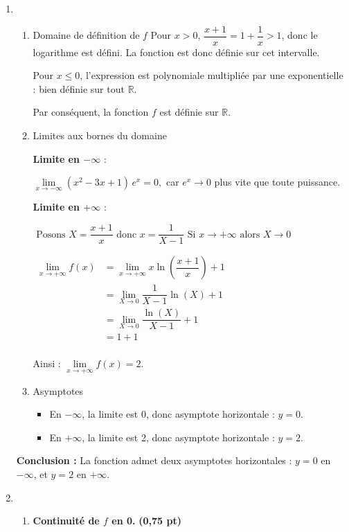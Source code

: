 \documentclass[12pt,a4paper]{article}
\begin{document}
\begin{enumerate}
\item 
    \begin{enumerate}
        \item Domaine de définition de \( f \)
        Pour \( x > 0 \), \( \dfrac{x+1}{x} = 1 + \dfrac{1}{x} > 1 \), donc le logarithme est défini. La fonction est donc définie sur cet intervalle.
     
        Pour \( x \leq 0 \), l'expression est polynomiale multipliée par une exponentielle : bien définie sur tout \( \mathbb{R} \).
     
        Par conséquent, la fonction \( f \) est définie sur \( \mathbb{R} \).

        \item Limites aux bornes du domaine
        
        \textbf{Limite en \( -\infty \)} :

        \( \lim\limits_{x \to -\infty} (x^2 - 3x + 1)\, e^x = 0, \)
         car \( e^x \to 0 \) plus vite que toute puissance.

         \textbf{Limite en \( +\infty \)} :

         \(\text{ Posons } X=\dfrac{x+1}{x} \text{ donc } x=\dfrac{1}{X-1} \text{ Si } x\to +\infty \text{ alors } X \to 0\)

         \(
            \begin{aligned}
                \lim\limits_{x \to +\infty}f(x)&=\lim\limits_{x \to +\infty}x \ln\left( \dfrac{x+1}{x} \right) + 1\\
                &=\lim\limits_{X \to 0}\dfrac{1}{X-1} \ln\left( X \right) + 1\\
                &=\lim\limits_{X \to 0}\dfrac{\ln\left( X \right)}{X-1}  + 1\\
                &=1  + 1\\
            \end{aligned}
        \)
        
         Ainsi : \(\lim\limits_{x \to +\infty} f(x) = 2.\)
        \item Asymptotes
        \begin{itemize}
            \item En \( -\infty \), la limite est 0, donc asymptote horizontale : \( y = 0 \).
            \item En \( +\infty \), la limite est 2, donc asymptote horizontale : \( y = 2 \).
\end{itemize}
    \end{enumerate} 
    \textbf{Conclusion :} La fonction admet deux asymptotes horizontales : \( y = 0 \) en \( -\infty \), et \( y = 2 \) en \( +\infty \).
    \item 
    \begin{enumerate}
        \item \textbf{Continuité de \( f \) en 0.} \hfill \textbf{(0,75 pt)}
        

\end{enumerate}
\end{enumerate}
\end{document}
